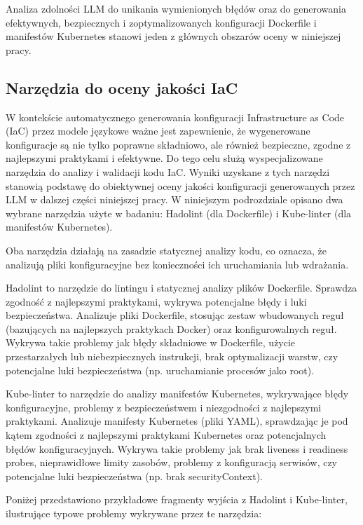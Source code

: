 Analiza zdolności LLM do unikania wymienionych błędów oraz do generowania efektywnych, bezpiecznych i zoptymalizowanych konfiguracji Dockerfile i manifestów Kubernetes stanowi jeden z głównych obszarów oceny w niniejszej pracy.



\subsection{Narzędzia do oceny jakości IaC}

W kontekście automatycznego generowania konfiguracji Infrastructure as Code (IaC) przez modele językowe ważne jest zapewnienie, że wygenerowane konfiguracje są nie tylko poprawne składniowo, ale również bezpieczne, zgodne z najlepszymi praktykami i efektywne. Do tego celu służą wyspecjalizowane narzędzia do analizy i walidacji kodu IaC. Wyniki uzyskane z tych narzędzi stanowią podstawę do obiektywnej oceny jakości konfiguracji generowanych przez LLM w dalszej części niniejszej pracy. W niniejszym podrozdziale opisano dwa wybrane narzędzia użyte w badaniu: Hadolint \cite{hadolint} (dla Dockerfile) i Kube-linter \cite{kubelinter} (dla manifestów Kubernetes).

Oba narzędzia działają na zasadzie statycznej analizy kodu, co oznacza, że analizują pliki konfiguracyjne bez konieczności ich uruchamiania lub wdrażania.

Hadolint to narzędzie do lintingu i statycznej analizy plików Dockerfile. Sprawdza zgodność z najlepszymi praktykami, wykrywa potencjalne błędy i luki bezpieczeństwa. Analizuje pliki Dockerfile, stosując zestaw wbudowanych reguł (bazujących na najlepszych praktykach Docker) oraz konfigurowalnych reguł. Wykrywa takie problemy jak błędy składniowe w Dockerfile, użycie przestarzałych lub niebezpiecznych instrukcji, brak optymalizacji warstw, czy potencjalne luki bezpieczeństwa (np. uruchamianie procesów jako root).

Kube-linter to narzędzie do analizy manifestów Kubernetes, wykrywające błędy konfiguracyjne, problemy z bezpieczeństwem i niezgodności z najlepszymi praktykami. Analizuje manifesty Kubernetes (pliki YAML), sprawdzając je pod kątem zgodności z najlepszymi praktykami Kubernetes oraz potencjalnych błędów konfiguracyjnych. Wykrywa takie problemy jak brak liveness i readiness probes, nieprawidłowe limity zasobów, problemy z konfiguracją serwisów, czy potencjalne luki bezpieczeństwa (np. brak securityContext).

Poniżej przedstawiono przykładowe fragmenty wyjścia z Hadolint i Kube-linter, ilustrujące typowe problemy wykrywane przez te narzędzia:

